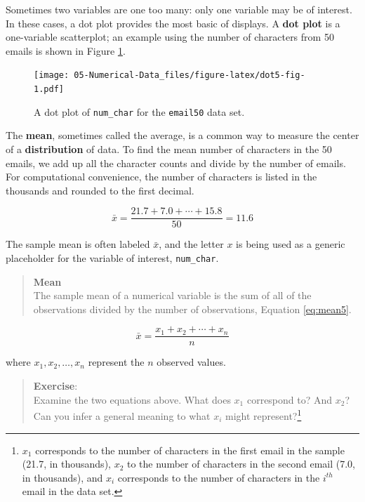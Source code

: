 \documentclass[
]{book}
\begin{document}
Sometimes two variables are one too many: only one variable may be of interest. In these cases, a dot plot provides the most basic of displays. A \textbf{dot plot} is a one-variable scatterplot; an example using the number of characters from 50 emails is shown in Figure \ref{fig:dot5-fig}.

\begin{figure}
\centering
\texttt{[image: 05-Numerical-Data\_files/figure-latex/dot5-fig-1.pdf]}
\caption{\label{fig:dot5-fig}A dot plot of \texttt{num\_char} for the \texttt{email50} data set.}
\end{figure}

The \textbf{mean}, sometimes called the average, is a common way to measure the center of a \textbf{distribution} of data. To find the mean number of characters in the 50 emails, we add up all the character counts and divide by the number of emails. For computational convenience, the number of characters is listed in the thousands and rounded to the first decimal.

\[\bar{x} = \frac{21.7 + 7.0 + \cdots + 15.8}{50} = 11.6\]

The sample mean is often labeled \(\bar{x}\), and the letter \(x\) is being used as a generic placeholder for the variable of interest, \texttt{num\_char}.

\begin{quote}
\textbf{Mean}\\
The sample mean of a numerical variable is the sum of all of the observations divided by the number of observations, Equation \eqref{eq:mean5}.
\end{quote}

\begin{equation} 
  \bar{x} = \frac{x_1+x_2+\cdots+x_n}{n}
  \label{eq:mean5}
\end{equation}

where \(x_1, x_2, \dots, x_n\) represent the \(n\) observed values.

\begin{quote}
\textbf{Exercise}:\\
Examine the two equations above. What does \(x_1\) correspond to? And \(x_2\)? Can you infer a general meaning to what \(x_i\) might represent?\footnote{\(x_1\) corresponds to the number of characters in the first email in the sample (21.7, in thousands), \(x_2\) to the number of characters in the second email (7.0, in thousands), and \(x_i\) corresponds to the number of characters in the \(i^{th}\) email in the data set.}
\end{quote}
\end{document}

